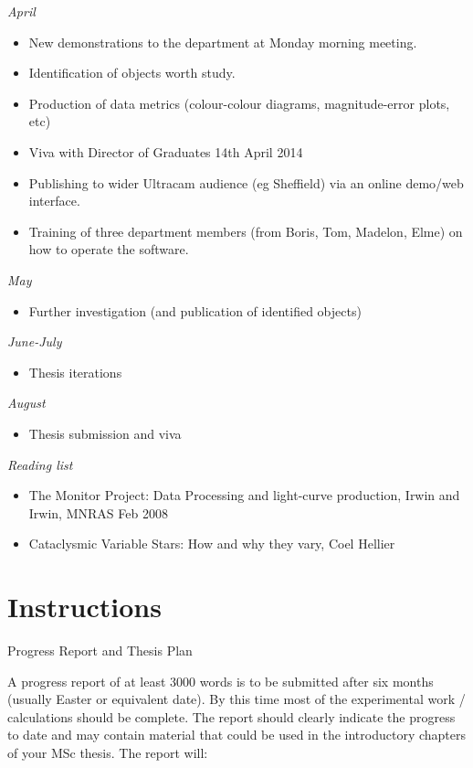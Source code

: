 \documentclass[a4paper,10pt]{article}
\begin{document}
\emph{April}
\begin{itemize} 
	\item New demonstrations to the department at Monday morning meeting.
	\item Identification of objects worth study.
	\item Production of data metrics (colour-colour diagrams, magnitude-error plots, etc)
	\item Viva with Director of Graduates 14th April 2014
	\item Publishing to wider Ultracam audience (eg Sheffield) via an online demo/web interface.
	\item Training of three department members (from Boris, Tom, Madelon, Elme) on how to operate the software.
\end{itemize}
	
	
\emph{May}
\begin{itemize} 
	\item Further investigation (and publication of identified objects)
\end{itemize}

\emph{June-July}
\begin{itemize} 
	\item Thesis iterations
\end{itemize}
	
\emph{August}
\begin{itemize} 
	\item Thesis submission and viva
\end{itemize}
	
\emph{Reading list}
\begin{itemize} 
	\item The Monitor Project: Data Processing and light-curve production, Irwin and Irwin, MNRAS Feb 2008
	\item Cataclysmic Variable Stars: How and why they vary, Coel Hellier
\end{itemize}


\section{Instructions}

Progress Report and Thesis Plan

A progress report of at least 3000 words is to be submitted after 
six months (usually Easter or equivalent date). By this time most of 
the experimental work / calculations should be complete. The report 
should clearly indicate the progress to date and may contain 
material that could be used in the introductory chapters of your MSc 
thesis. The report will:
\end{document}

